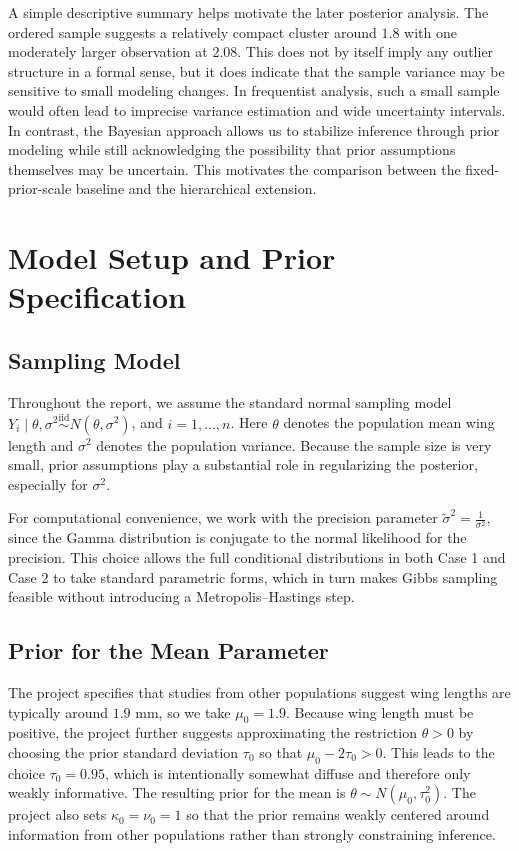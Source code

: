 \documentclass[11pt]{article}
\begin{document}
A simple descriptive summary helps motivate the later posterior analysis. The ordered sample suggests a relatively compact cluster around $1.8$ with one moderately larger observation at $2.08$. This does not by itself imply any outlier structure in a formal sense, but it does indicate that the sample variance may be sensitive to small modeling changes. In frequentist analysis, such a small sample would often lead to imprecise variance estimation and wide uncertainty intervals. In contrast, the Bayesian approach allows us to stabilize inference through prior modeling while still acknowledging the possibility that prior assumptions themselves may be uncertain. This motivates the comparison between the fixed-prior-scale baseline and the hierarchical extension.

\section{Model Setup and Prior Specification}

\subsection{Sampling Model}

Throughout the report, we assume the standard normal sampling model $Y_i \mid \theta,\sigma^2 \overset{\mathrm{iid}}{\sim} N(\theta,\sigma^2)$, and $i=1,\dots,n$.
Here $\theta$ denotes the population mean wing length and $\sigma^2$ denotes the population variance. Because the sample size is very small, prior assumptions play a substantial role in regularizing the posterior, especially for $\sigma^2$.

For computational convenience, we work with the precision parameter $\tilde{\sigma}^2 = \frac{1}{\sigma^2}$,
since the Gamma distribution is conjugate to the normal likelihood for the precision. This choice allows the full conditional distributions in both Case 1 and Case 2 to take standard parametric forms, which in turn makes Gibbs sampling feasible without introducing a Metropolis--Hastings step.

\subsection{Prior for the Mean Parameter}

The project specifies that studies from other populations suggest wing lengths are typically around $1.9$ mm, so we take $\mu_0 = 1.9$. Because wing length must be positive, the project further suggests approximating the restriction $\theta > 0$ by choosing the prior standard deviation $\tau_0$ so that $\mu_0 - 2\tau_0 > 0$. This leads to the choice $\tau_0 = 0.95$, which is intentionally somewhat diffuse and therefore only weakly informative. The resulting prior for the mean is $\theta \sim N(\mu_0,\tau_0^2)$.
The project also sets $\kappa_0 = \nu_0 = 1$ so that the prior remains weakly centered around information from other populations rather than strongly constraining inference.
\end{document}
